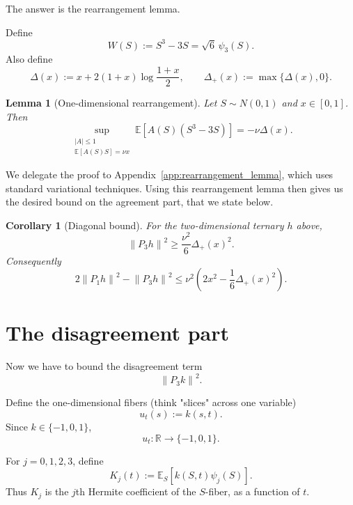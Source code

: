 \documentclass[11pt]{article}
\newtheorem{lemma}[theorem]{Lemma}
\newtheorem{corollary}[theorem]{Corollary}
\newcommand{\R}{\mathbb R}
\newcommand{\E}{\mathbb E}
\newcommand{\norm}[1]{\left\|#1\right\|}
\begin{document}
The answer is the rearrangement lemma.

Define
\[
        W(S):=S^3-3S=\sqrt6\,\psi_3(S).
\]
Also define
\[
        \Delta(x):=x+2(1+x)\log\frac{1+x}{2},
        \qquad
        \Delta_+(x):=\max\{\Delta(x),0\}.
\]

\begin{lemma}[One-dimensional rearrangement]
Let $S\sim N(0,1)$ and $x\in[0,1]$.  Then
\[
        \sup_{\substack{|A|\le1\\ \E[A(S)S]=\nu x}}
        \E[A(S)(S^3-3S)]
        =-\nu\Delta(x).
\]
\end{lemma}

We delegate the proof to Appendix~\ref{app:rearrangement_lemma}, which uses standard variational techniques. Using this rearrangement lemma then gives us the desired bound on the agreement part, that we state below. 

\begin{corollary}[Diagonal bound]
For the two-dimensional ternary $h$ above,
\[
        \norm{P_3h}^2\ge \frac{\nu^2}{6}\Delta_+(x)^2.
\]
Consequently
\[
        2\norm{P_1h}^2-\norm{P_3h}^2
        \le
        \nu^2\left(2x^2-\frac16\Delta_+(x)^2\right).
\]
\end{corollary}

\section{The disagreement part}

Now we have to bound the disagreement term
\[
        \norm{P_3k}^2.
\]

Define the one-dimensional fibers (think "slices" across one variable) 
\[
        u_t(s):=k(s,t).
\]
Since $k\in\{-1,0,1\}$,
\[
        u_t:\R\to\{-1,0,1\}.
\]

For $j=0,1,2,3$, define
\[
        K_j(t):=\E_S[k(S,t)\psi_j(S)].
\]
Thus $K_j$ is the $j$th Hermite coefficient of the $S$-fiber, as a function of $t$.
\end{document}
